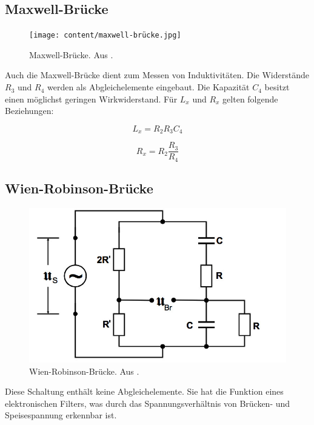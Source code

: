\subsection{Maxwell-Brücke}

\begin{figure}
  \centering
  \texttt{[image: content/maxwell-brücke.jpg]}
  \caption{Maxwell-Brücke. Aus \cite{anleitung302}.}
  \label{fig:maxwell}
\end{figure}

Auch die Maxwell-Brücke dient zum Messen von Induktivitäten. Die Widerstände $R_3$ und $R_4$ werden als Abgleichelemente eingebaut. Die Kapazität $C_4$ besitzt einen möglichst geringen Wirkwiderstand. Für $L_x$ und $R_x$ gelten folgende Beziehungen:

\begin{equation}
  \label{eqn:max1}
  L_x = R_{2} R_3 C_4
\end{equation}

\begin{equation}
  \label{eqn:max2}
  R_x = R_{2} \frac {R_3}{R_4}
\end{equation}

\subsection{Wien-Robinson-Brücke}

\begin{figure}
  \centering
  \includegraphics[scale=0.5]{content/wien-robinson.jpg}
  \caption{Wien-Robinson-Brücke. Aus \cite{anleitung302}.}
  \label{fig:wien-robinson}
\end{figure}

Diese Schaltung enthält keine Abgleichelemente. Sie hat die Funktion eines elektronischen Filters, was durch das Spannungsverhältnis von Brücken- und Speisespannung erkennbar ist.


